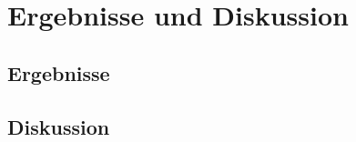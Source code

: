 \chapter{Ergebnisse und Diskussion}

\section{Ergebnisse}
\lipsum[8]

\section{Diskussion}
\lipsum[9]
